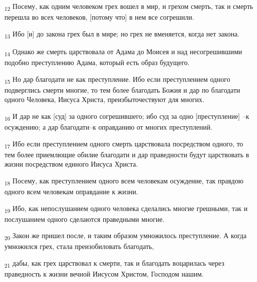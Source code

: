 \begin{tcolorbox}
\textsubscript{12} Посему, как одним человеком грех вошел в мир, и грехом смерть, так и смерть перешла во всех человеков, [потому что] в нем все согрешили.
\end{tcolorbox}
\begin{tcolorbox}
\textsubscript{13} Ибо [и] до закона грех был в мире; но грех не вменяется, когда нет закона.
\end{tcolorbox}
\begin{tcolorbox}
\textsubscript{14} Однако же смерть царствовала от Адама до Моисея и над несогрешившими подобно преступлению Адама, который есть образ будущего.
\end{tcolorbox}
\begin{tcolorbox}
\textsubscript{15} Но дар благодати не как преступление. Ибо если преступлением одного подверглись смерти многие, то тем более благодать Божия и дар по благодати одного Человека, Иисуса Христа, преизбыточествуют для многих.
\end{tcolorbox}
\begin{tcolorbox}
\textsubscript{16} И дар не как [суд] за одного согрешившего; ибо суд за одно [преступление] --к осуждению; а дар благодати--к оправданию от многих преступлений.
\end{tcolorbox}
\begin{tcolorbox}
\textsubscript{17} Ибо если преступлением одного смерть царствовала посредством одного, то тем более приемлющие обилие благодати и дар праведности будут царствовать в жизни посредством единого Иисуса Христа.
\end{tcolorbox}
\begin{tcolorbox}
\textsubscript{18} Посему, как преступлением одного всем человекам осуждение, так правдою одного всем человекам оправдание к жизни.
\end{tcolorbox}
\begin{tcolorbox}
\textsubscript{19} Ибо, как непослушанием одного человека сделались многие грешными, так и послушанием одного сделаются праведными многие.
\end{tcolorbox}
\begin{tcolorbox}
\textsubscript{20} Закон же пришел после, и таким образом умножилось преступление. А когда умножился грех, стала преизобиловать благодать,
\end{tcolorbox}
\begin{tcolorbox}
\textsubscript{21} дабы, как грех царствовал к смерти, так и благодать воцарилась через праведность к жизни вечной Иисусом Христом, Господом нашим.
\end{tcolorbox}
